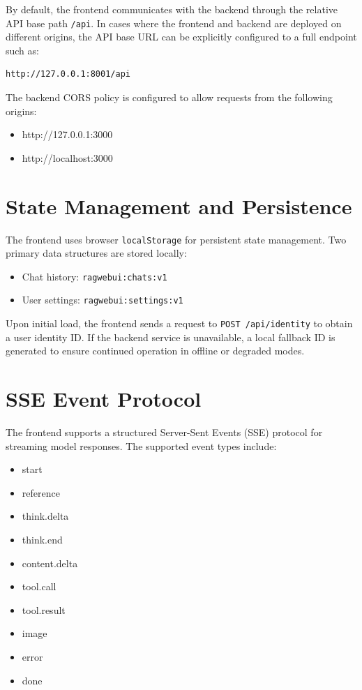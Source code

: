 By default, the frontend communicates with the backend through the relative API base path \texttt{/api}. In cases where the frontend and backend are deployed on different origins, the API base URL can be explicitly configured to a full endpoint such as:

\begin{verbatim}
http://127.0.0.1:8001/api
\end{verbatim}

The backend CORS policy is configured to allow requests from the following origins:

\begin{itemize}
    \item http://127.0.0.1:3000
    \item http://localhost:3000
\end{itemize}

\section{State Management and Persistence}

The frontend uses browser \texttt{localStorage} for persistent state management. Two primary data structures are stored locally:

\begin{itemize}
    \item Chat history: \texttt{ragwebui:chats:v1}
    \item User settings: \texttt{ragwebui:settings:v1}
\end{itemize}

Upon initial load, the frontend sends a request to \texttt{POST /api/identity} to obtain a user identity ID. If the backend service is unavailable, a local fallback ID is generated to ensure continued operation in offline or degraded modes.

\section{SSE Event Protocol}

The frontend supports a structured Server-Sent Events (SSE) protocol for streaming model responses. The supported event types include:

\begin{itemize}
    \item start
    \item reference
    \item think.delta
    \item think.end
    \item content.delta
    \item tool.call
    \item tool.result
    \item image
    \item error
    \item done
\end{itemize}

